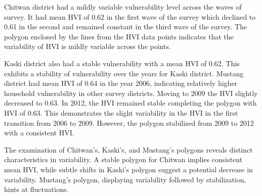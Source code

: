 Chitwan district had a mildly variable vulnerability level across the waves of survey. It had mean HVI of 0.62 in the first wave of the survey which declined to 0.61 in the second and remained constant in the third wave of the survey. The polygon enclosed by the lines from the HVI data points indicates that the variability of HVI is mildly variable across the points.\par

Kaski district also had a stable vulnerability with a mean HVI of 0.62. This exhibits a stability of vulnerability over the years for Kaski district. Mustang district had mean HVI of 0.64 in the year 2006, indicating relatively higher household vulnerability in other survey districts. Moving to 2009 the HVI slightly decreased to 0.63. In 2012, the HVI remained stable completing the polygon with HVI of 0.63. This demonstrates the slight variability in the HVI in the first transition from 2006 to 2009. However, the polygon stabilized from 2009 to 2012 with a consistent HVI.\par 

The examination of Chitwan's, Kaski's, and Mustang's polygons reveals distinct characteristics in variability. A stable polygon for Chitwan implies consistent mean HVI, while subtle shifts in Kaski's polygon suggest a potential decrease in variability. Mustang's polygon, displaying variability followed by stabilization, hints at fluctuations.\par

